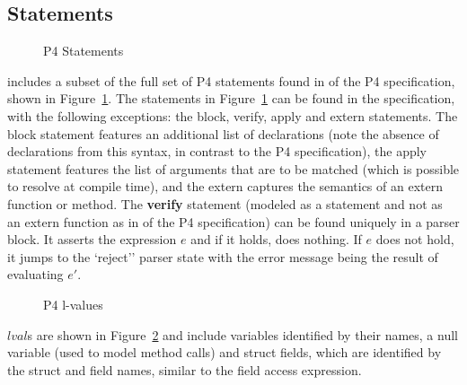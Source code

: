 \documentclass[UTF8]{article}
\begin{document}
\newpage
\newcommand{\accept}{``accept''}
\newcommand{\reject}{`reject''}
\subsection{Statements} \label{ssec:stmt}

\begin{figure}[h!]
\centering\ottgrammartabular{
\ottstmt\ottafterlastrule
}
\caption{P4 Statements}
\label{fig:stmt}
\end{figure}

\pfott{} includes a subset of the full set of P4 statements found in  of the P4 specification, shown in Figure~\ref{fig:stmt}. The statements in Figure~\ref{fig:stmt} can be found in the specification, with the following exceptions: the block, verify, apply and extern statements. The block statement features an additional list of declarations (note the absence of declarations from this syntax, in contrast to the P4 specification), the apply statement features the list of arguments that are to be matched (which is possible to resolve at compile time), and the extern captures the semantics of an extern function or method. The \textbf{verify} statement (modeled as a statement and not as an extern function as in  of the P4 specification) can be found uniquely in a parser block. It asserts the expression $e$ and if it holds, does nothing. If $e$ does not hold, it jumps to the \reject{} parser state with the error message being the result of evaluating $e'$.

\begin{figure}[h!]
\centering\ottgrammartabular{
\ottlval\ottafterlastrule
}
\caption{P4 l-values}
\label{fig:lval}
\end{figure}

$lval$s are shown in Figure~\ref{fig:lval} and include variables identified by their names, a null variable (used to model method calls) and struct fields, which are identified by the struct and field names, similar to the field access expression.

\newpage
\newcommand{\exstate}{\ensuremath{s}}
\newcommand{\astate}{\ensuremath{{\gamma}_A}}
\newcommand{\currsf}{\ensuremath{\varepsilon}}
\newcommand{\gscope}{\ensuremath{{\gamma}_G}}
\newcommand{\gscopel}{\ensuremath{\overline{\gamma_G}}}
\newcommand{\escope}{\ensuremath{{\gamma}_{\emptyset}}}
\newcommand{\cstack}{E}
\newcommand{\status}{\ensuremath{t}}
\newcommand{\running}{\textbf{run}}
\newcommand{\returnst}[1]{\ensuremath{\textbf{ret}\;#1}}
\newcommand{\trans}[1]{\ensuremath{\textbf{tra}\;#1}}
\newcommand{\sterr}{\ensuremath{\bot}}
\newcommand{\pfin}{\ensuremath{p_{\mathrm{fin}}}}
\newcommand{\expr}{\ensuremath{e}}
\newcommand{\varstar}{\mathbf{var} ( \mathbf{star} , funn )}
\newcommand{\scope}{\gamma}
\newcommand{\scopeL}{\overline{\gamma}}
\newcommand{\stmtL}{\overline{stmt}}
\newcommand{\cons}{, ... \, ,}
\newcommand{\concat}{{+}\mspace{-8mu}{+}}
\newcommand{\funn}{\ensuremath{funn}}
\newcommand{\bitv}{\ensuremath{bitv}}
\newcommand{\estmt}{\emptyset_{ \mathrm{stmt} }}
\newcommand{\frameL}{\overline{\Phi}}
\newcommand{\declL}{\overline{decl}}
\end{document}
